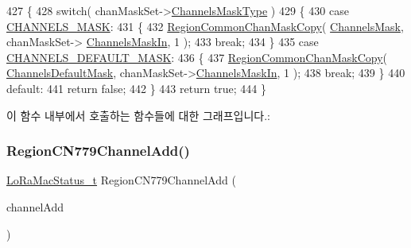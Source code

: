 \begin{DoxyCode}
427 \{
428     \textcolor{keywordflow}{switch}( chanMaskSet->\mbox{\hyperlink{structs_chan_mask_set_params_a02b75be74cbc34fa2126b2c250ea9283}{ChannelsMaskType}} )
429     \{
430         \textcolor{keywordflow}{case} \mbox{\hyperlink{group___r_e_g_i_o_n_gga7a62e669f567fc160ad58210664bca9ca1e68275c0b16a0c4935eada4315dd089}{CHANNELS\_MASK}}:
431         \{
432             \mbox{\hyperlink{group___r_e_g_i_o_n_c_o_m_m_o_n_ga95f5199d490113269fae7f2e0569e9a0}{RegionCommonChanMaskCopy}}( \mbox{\hyperlink{_region_c_n779_8c_a2188957b5ca6af8092154d7ccbfa5757}{ChannelsMask}}, chanMaskSet->
      \mbox{\hyperlink{structs_chan_mask_set_params_ade387d6ecaf27781b14ad97ebdfc0695}{ChannelsMaskIn}}, 1 );
433             \textcolor{keywordflow}{break};
434         \}
435         \textcolor{keywordflow}{case} \mbox{\hyperlink{group___r_e_g_i_o_n_gga7a62e669f567fc160ad58210664bca9ca9bbb18c8600ad8781ba04a2cb121ea60}{CHANNELS\_DEFAULT\_MASK}}:
436         \{
437             \mbox{\hyperlink{group___r_e_g_i_o_n_c_o_m_m_o_n_ga95f5199d490113269fae7f2e0569e9a0}{RegionCommonChanMaskCopy}}( 
      \mbox{\hyperlink{_region_c_n779_8c_ac127b19779301713d5ed92eb03366a2d}{ChannelsDefaultMask}}, chanMaskSet->\mbox{\hyperlink{structs_chan_mask_set_params_ade387d6ecaf27781b14ad97ebdfc0695}{ChannelsMaskIn}}, 1 );
438             \textcolor{keywordflow}{break};
439         \}
440         \textcolor{keywordflow}{default}:
441             \textcolor{keywordflow}{return} \textcolor{keyword}{false};
442     \}
443     \textcolor{keywordflow}{return} \textcolor{keyword}{true};
444 \}
\end{DoxyCode}
이 함수 내부에서 호출하는 함수들에 대한 그래프입니다.\+:
\mbox{\label{group___r_e_g_i_o_n_c_n779_ga087a9e4729bae8b825db62caca5f20d2}} 
\subsubsection{\texorpdfstring{Region\+C\+N779\+Channel\+Add()}{RegionCN779ChannelAdd()}}
{\footnotesize\ttfamily \mbox{\hyperlink{group___l_o_r_a_m_a_c_ga30bd25657e10480f8605ee951b0ecfbd}{Lo\+Ra\+Mac\+Status\+\_\+t}} Region\+C\+N779\+Channel\+Add (\begin{DoxyParamCaption}\item[{\mbox{\hyperlink{group___r_e_g_i_o_n_gab1c5f3aa06614283202906cef4417860}{Channel\+Add\+Params\+\_\+t}} $\ast$}]{channel\+Add }\end{DoxyParamCaption})}



